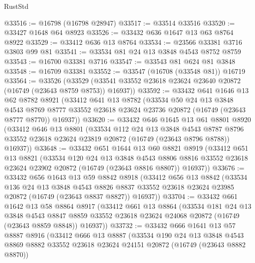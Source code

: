 \begin{lexlean}{RustStd}
\begin{coremodule}
@33516 := @16798 (@16798 @28947)
@33517 := @33514 @33516
@33520 := @33427 @1648 @64 @8923
@33526 := @33432 @636 @1647 @13 @63 @8764 @8922
@33529 := @33412 @636 @13 @8764
@33534 := @23566 @33381 @3716 @3803 @99 @81
@33541 := @33534 @81 @24 @13 @3848 @4543 @8752 @8759
@33543 := @16700 @33381 @3716
@33547 := @33543 @81 @624 @81 @3848
@33548 := @16709 @33381
@33552 := @33547 (@16708 (@33548 @81)) @16719
@33564 := @33526
    (@33529 (@33541 @33552 @23618 @23624 @23640 @20872 (@16749 (@23643 @8759 @8753)) @16937))
@33592 := @33432
    @641
    @1646
    @13
    @62
    @8782
    @8921
    (@33412
      @641
      @13
      @8782
      (@33534
        @50
        @24
        @13
        @3848
        @4543
        @8769
        @8777
        @33552
        @23618
        @23624
        @23736
        @20872
        (@16749 (@23643 @8777 @8770))
        @16937))
@33620 := @33432
    @646
    @1645
    @13
    @61
    @8801
    @8920
    (@33412
      @646
      @13
      @8801
      (@33534
        @112
        @24
        @13
        @3848
        @4543
        @8787
        @8796
        @33552
        @23618
        @23624
        @23819
        @20872
        (@16749 (@23643 @8796 @8788))
        @16937))
@33648 := @33432
    @651
    @1644
    @13
    @60
    @8821
    @8919
    (@33412
      @651
      @13
      @8821
      (@33534
        @120
        @24
        @13
        @3848
        @4543
        @8806
        @8816
        @33552
        @23618
        @23624
        @23902
        @20872
        (@16749 (@23643 @8816 @8807))
        @16937))
@33676 := @33432
    @656
    @1643
    @13
    @59
    @8842
    @8918
    (@33412
      @656
      @13
      @8842
      (@33534
        @136
        @24
        @13
        @3848
        @4543
        @8826
        @8837
        @33552
        @23618
        @23624
        @23985
        @20872
        (@16749 (@23643 @8837 @8827))
        @16937))
@33704 := @33432
    @661
    @1642
    @13
    @58
    @8864
    @8917
    (@33412
      @661
      @13
      @8864
      (@33534
        @181
        @24
        @13
        @3848
        @4543
        @8847
        @8859
        @33552
        @23618
        @23624
        @24068
        @20872
        (@16749 (@23643 @8859 @8848))
        @16937))
@33732 := @33432
    @666
    @1641
    @13
    @57
    @8887
    @8916
    (@33412
      @666
      @13
      @8887
      (@33534
        @190
        @24
        @13
        @3848
        @4543
        @8869
        @8882
        @33552
        @23618
        @23624
        @24151
        @20872
        (@16749 (@23643 @8882 @8870))

\end{coremodule}
\end{lexlean}
